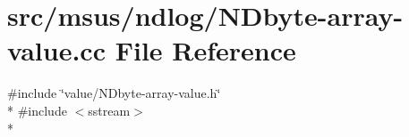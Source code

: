 \hypertarget{_n_dbyte-array-value_8cc}{\section{src/msus/ndlog/\-N\-Dbyte-\/array-\/value.cc File Reference}
\label{_n_dbyte-array-value_8cc}
}
{\ttfamily \#include \char`\"{}value/\-N\-Dbyte-\/array-\/value.\-h\char`\"{}}\\*
{\ttfamily \#include $<$sstream$>$}\\*
